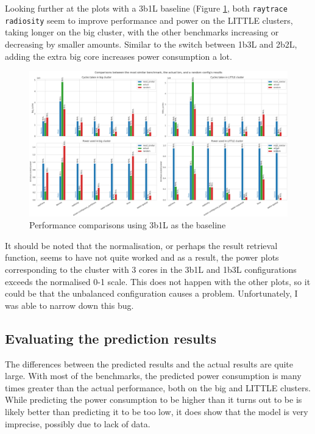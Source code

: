    Looking further at the plots with a 3b1L baseline (Figure 
    \ref{fig:s-2b2L-r-3b1L}, both \texttt{raytrace} \texttt{radiosity} seem to 
    improve performance and power on the LITTLE clusters, taking longer on the 
    big cluster, with the other benchmarks increasing or decreasing by smaller 
    amounts. Similar to the switch between 1b3L and 2b2L, adding the extra big
    core increases power consumption a lot.
    \begin{figure}
        \centering
        \includegraphics[width=\textwidth]{pred-plots/stock-2b2L/rand-3b1L.png}
        \caption{Performance comparisons using 3b1L as the baseline}
        \label{fig:s-2b2L-r-3b1L}
    \end{figure}
    
    It should be noted that the normalisation, or perhaps the result retrieval 
    function, seems to have not quite worked and as a result, the power plots 
    corresponding to the cluster with 3 cores in the 3b1L and 1b3L 
    configurations exceeds the normalised 0-1 scale. This does not happen with 
    the other plots, so it could be that the unbalanced configuration causes a 
    problem. Unfortunately, I was able to narrow down this bug.
    
    \subsection{Evaluating the prediction results}
    The differences between the predicted results and the actual results are 
    quite large. With most of the benchmarks, the predicted power consumption is
    many times greater than the actual performance, both on the big and LITTLE 
    clusters. While predicting the power consumption to be higher than it turns 
    out to be is likely better than predicting it to be too low, it does show 
    that the model is very imprecise, possibly due to lack of data.
    
